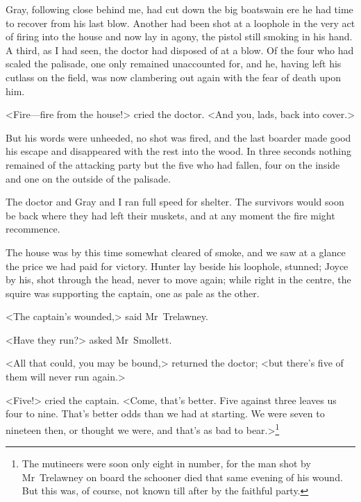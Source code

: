 Gray, following close behind me, had cut down the big boatswain ere he had time to recover from his last blow. Another had been shot at a loophole in the very act of firing into the house and now lay in agony, the pistol still smoking in his hand. A third, as I had seen, the doctor had disposed of at a blow. Of the four who had scaled the palisade, one only remained unaccounted for, and he, having left his cutlass on the field, was now clambering out again with the fear of death upon him.

<Fire—fire from the house!> cried the doctor. <And you, lads, back into cover.>

But his words were unheeded, no shot was fired, and the last boarder made good his escape and disappeared with the rest into the wood. In three seconds nothing remained of the attacking party but the five who had fallen, four on the inside and one on the outside of the palisade.

The doctor and Gray and I ran full speed for shelter. The survivors would soon be back where they had left their muskets, and at any moment the fire might recommence.

The house was by this time somewhat cleared of smoke, and we saw at a glance the price we had paid for victory. Hunter lay beside his loophole, stunned; Joyce by his, shot through the head, never to move again; while right in the centre, the squire was supporting the captain, one as pale as the other.

<The captain's wounded,> said Mr~Trelawney.

<Have they run?> asked Mr~Smollett.

<All that could, you may be bound,> returned the doctor; <but there's five of them will never run again.>

<Five!> cried the captain. <Come, that's better. Five against three leaves us four to nine. That's better odds than we had at starting. We were seven to nineteen then, or thought we were, and that's as bad to bear.>\footnote{The mutineers were soon only eight in number, for the man shot by Mr~Trelawney on board the schooner died that same evening of his wound. But this was, of course, not known till after by the faithful party.}
